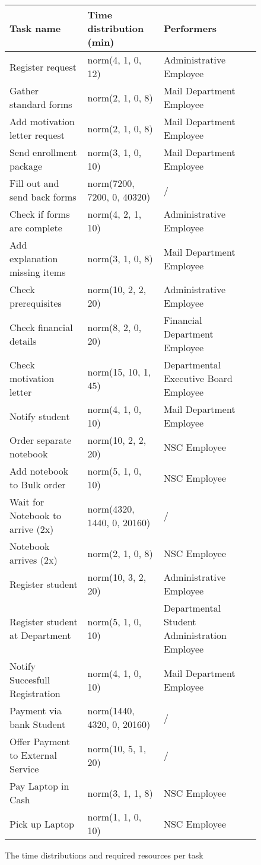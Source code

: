 
\begin{figure}[h!]
	\centering
	\begin{tabularx}{\textwidth}{ | X | X | X | }
		\hline
		\textbf{Task name} & \textbf{Time distribution (min)} & \textbf{Performers}\\ \hline\hline
		Register request & norm(4, 1, 0, 12) & Administrative Employee \\ \hline
		Gather standard forms & norm(2, 1, 0, 8) & Mail Department Employee \\ \hline
		Add motivation letter request & norm(2, 1, 0, 8) & Mail Department Employee \\ \hline
		Send enrollment package & norm(3, 1, 0, 10) & Mail Department Employee \\ \hline
		Fill out and send back forms & norm(7200, 7200, 0, 40320) & / \\ \hline
		Check if forms are complete & norm(4, 2, 1, 10) & Administrative Employee \\ \hline
		Add explanation missing items & norm(3, 1, 0, 8) & Mail Department Employee \\ \hline
		Check prerequisites & norm(10, 2, 2, 20) & Administrative Employee \\ \hline
		Check financial details & norm(8, 2, 0, 20) & Financial Department Employee \\ \hline
		Check motivation letter & norm(15, 10, 1, 45) & Departmental Executive Board Employee \\ \hline
		Notify student & norm(4, 1, 0, 10) & Mail Department Employee \\ \hline
		Order separate notebook & norm(10, 2, 2, 20) & NSC Employee \\ \hline
		Add notebook to Bulk order & norm(5, 1, 0, 10) & NSC Employee \\ \hline
		Wait for Notebook to arrive (2x) & norm(4320, 1440, 0, 20160) & / \\ \hline
		Notebook arrives (2x) & norm(2, 1, 0, 8) & NSC Employee \\ \hline
		Register student & norm(10, 3, 2, 20) & 
		Administrative Employee \\ \hline
		Register student at Department & norm(5, 1, 0, 10) & Departmental Student Administration Employee \\ \hline
		Notify Succesfull Registration & norm(4, 1, 0, 10) & Mail Department Employee \\ \hline
		Payment via bank Student & norm(1440, 4320, 0, 20160) & / \\ \hline
		Offer Payment to External Service & norm(10, 5, 1, 20) & / \\ \hline
		Pay Laptop in Cash & norm(3, 1, 1, 8) & NSC Employee \\ \hline
		Pick up Laptop & norm(1, 1, 0, 10) & NSC Employee \\
		\hline
	\end{tabularx}
	\caption{The time distributions and required resources per task}
	\label{fig:tasktimes2}
\end{figure}
